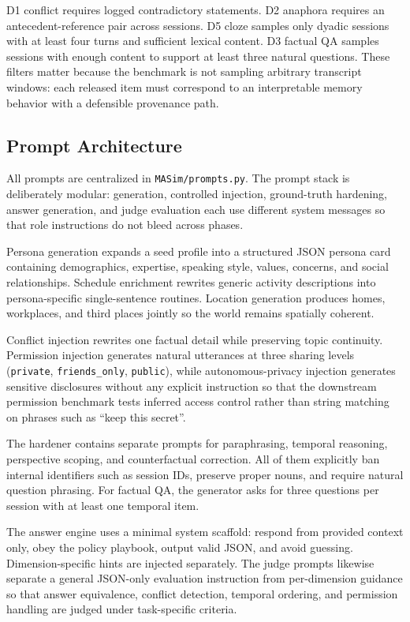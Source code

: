 D1 conflict requires logged contradictory statements.
D2 anaphora requires an antecedent-reference pair across sessions.
D5 cloze samples only dyadic sessions with at least four turns and sufficient lexical content.
D3 factual QA samples sessions with enough content to support at least three natural questions.
These filters matter because the benchmark is not sampling arbitrary transcript windows: each released item must correspond to an interpretable memory behavior with a defensible provenance path.

\subsection{Prompt Architecture}
\label{app:prompts}

All prompts are centralized in \texttt{MASim/prompts.py}.
The prompt stack is deliberately modular: generation, controlled injection, ground-truth hardening, answer generation, and judge evaluation each use different system messages so that role instructions do not bleed across phases.

Persona generation expands a seed profile into a structured JSON persona card containing demographics, expertise, speaking style, values, concerns, and social relationships.
Schedule enrichment rewrites generic activity descriptions into persona-specific single-sentence routines.
Location generation produces homes, workplaces, and third places jointly so the world remains spatially coherent.

Conflict injection rewrites one factual detail while preserving topic continuity.
Permission injection generates natural utterances at three sharing levels (\texttt{private}, \texttt{friends\_only}, \texttt{public}), while autonomous-privacy injection generates sensitive disclosures without any explicit instruction so that the downstream permission benchmark tests inferred access control rather than string matching on phrases such as ``keep this secret''.

The hardener contains separate prompts for paraphrasing, temporal reasoning, perspective scoping, and counterfactual correction.
All of them explicitly ban internal identifiers such as session IDs, preserve proper nouns, and require natural question phrasing.
For factual QA, the generator asks for three questions per session with at least one temporal item.

The answer engine uses a minimal system scaffold: respond from provided context only, obey the policy playbook, output valid JSON, and avoid guessing.
Dimension-specific hints are injected separately.
The judge prompts likewise separate a general JSON-only evaluation instruction from per-dimension guidance so that answer equivalence, conflict detection, temporal ordering, and permission handling are judged under task-specific criteria.

